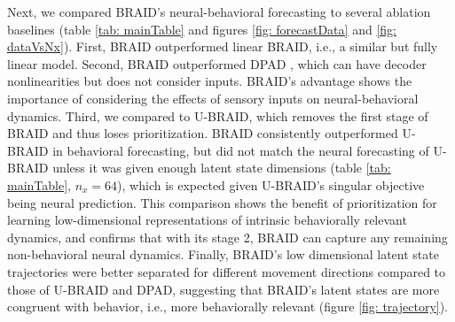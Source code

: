 \documentclass{article} %
\newcommand{\ourmethod}{BRAID}
\newcommand{\ourmethodlinear}{linear \ourmethod}
\newcommand{\ourmethodunsup}{U-\ourmethod}
\begin{document}
Next, we compared \ourmethod{}'s neural-behavioral forecasting to several ablation baselines (table \ref{tab: mainTable} and figures \ref{fig: forecastData} and \ref{fig: dataVsNx}). First, \ourmethod{} outperformed \ourmethodlinear{}, i.e., a similar but fully linear model. Second, \ourmethod{} outperformed DPAD \citep{sani2024dissociative}, which can have decoder nonlinearities but does not consider inputs. \ourmethod{}'s advantage shows the importance of considering the effects of sensory inputs on neural-behavioral dynamics. Third, we compared to \ourmethodunsup{}, which removes the first stage of \ourmethod{} and thus loses prioritization. 
\ourmethod{} consistently outperformed \ourmethodunsup{} in behavioral forecasting, but did not match the neural forecasting of \ourmethodunsup{} unless it was given enough latent state dimensions (table \ref{tab: mainTable}, $n_x\!=\!64$), which is expected given \ourmethodunsup{}'s singular objective being neural prediction. This comparison shows the benefit of prioritization for learning low-dimensional representations of intrinsic behaviorally relevant dynamics, and confirms that with its stage 2, \ourmethod{} can capture any remaining non-behavioral neural dynamics. Finally, \ourmethod{}'s low dimensional latent state trajectories were better separated for different movement directions  compared to those of \ourmethodunsup{} and DPAD, suggesting that \ourmethod{}'s latent states are more congruent with behavior, i.e., more behaviorally relevant (figure \ref{fig: trajectory}).
\end{document}

